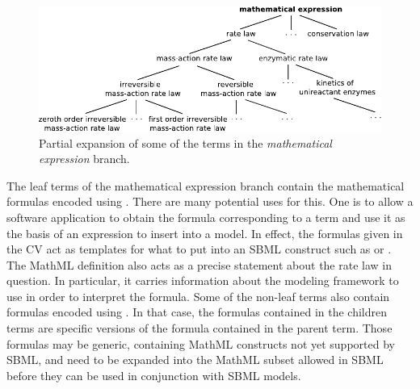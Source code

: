 \begin{figure}[tbh]
  \centering
  \includegraphics[scale = 0.8]{figs/sbo-math-expression}
  \caption{Partial expansion of some of the terms in the \emph{mathematical
      expression} branch.}
  \label{fig:sbo-math-expression}
\end{figure}

The leaf terms of the mathematical expression branch contain the
mathematical formulas encoded using \mathmltwo.  There are many
potential uses for this.  One is to allow a software application
to obtain the formula corresponding to a term and use it as the
basis of an expression to insert into a model.  In effect, the
formulas given in the CV act as templates for what to put into an
SBML construct such as \KineticLaw or \Rule.  The MathML
definition also acts as a precise statement about the rate law in
question. In particular, it carries information about the modeling
framework to use in order to interpret the formula.  Some of the
non-leaf terms also contain formulas encoded using \mathmltwo. In
that case, the formulas contained in the children terms are
specific versions of the formula contained in the parent term.
Those formulas may be generic, containing MathML constructs not
yet supported by SBML, and need to be expanded into the MathML
subset allowed in SBML before they can be used in conjunction with
SBML models.

